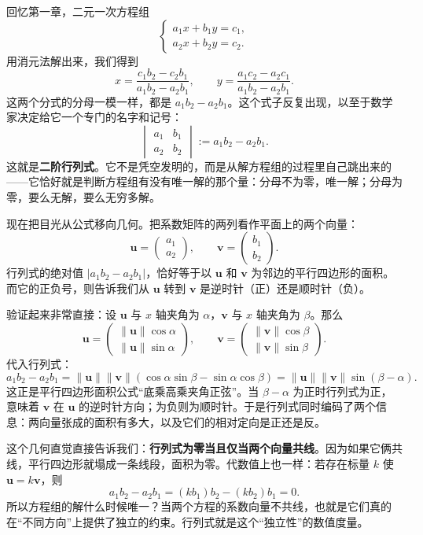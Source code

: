 \documentclass[UTF8]{ctexbook}
\begin{document}
回忆第一章，二元一次方程组
\begin{equation*}
\begin{cases}
 a_1x+b_1y=c_1,\\
 a_2x+b_2y=c_2.
\end{cases}
\end{equation*}
用消元法解出来，我们得到
\[
x=\frac{c_1b_2-c_2b_1}{a_1b_2-a_2b_1},\qquad
y=\frac{a_1c_2-a_2c_1}{a_1b_2-a_2b_1}.
\]
这两个分式的分母一模一样，都是 $a_1b_2-a_2b_1$。这个式子反复出现，以至于数学家决定给它一个专门的名字和记号：
\[
\begin{vmatrix}
a_1 & b_1\\
a_2 & b_2
\end{vmatrix}
:= a_1b_2-a_2b_1.
\]
这就是\textbf{二阶行列式}。它不是凭空发明的，而是从解方程组的过程里自己跳出来的——它恰好就是判断方程组有没有唯一解的那个量：分母不为零，唯一解；分母为零，要么无解，要么无穷多解。

现在把目光从公式移向几何。把系数矩阵的两列看作平面上的两个向量：
\[
\mathbf{u}=\begin{pmatrix}a_1\\a_2\end{pmatrix},\qquad
\mathbf{v}=\begin{pmatrix}b_1\\b_2\end{pmatrix}.
\]
行列式的绝对值 $|a_1b_2-a_2b_1|$，恰好等于以 $\mathbf{u}$ 和 $\mathbf{v}$ 为邻边的平行四边形的面积。而它的正负号，则告诉我们从 $\mathbf{u}$ 转到 $\mathbf{v}$ 是逆时针（正）还是顺时针（负）。

验证起来非常直接：设 $\mathbf{u}$ 与 $x$ 轴夹角为 $\alpha$，$\mathbf{v}$ 与 $x$ 轴夹角为 $\beta$。那么
\[
\mathbf{u}=\begin{pmatrix}\|\mathbf{u}\|\cos\alpha\\ \|\mathbf{u}\|\sin\alpha\end{pmatrix},\qquad
\mathbf{v}=\begin{pmatrix}\|\mathbf{v}\|\cos\beta\\ \|\mathbf{v}\|\sin\beta\end{pmatrix}.
\]
代入行列式：
\[
a_1b_2-a_2b_1
=\|\mathbf{u}\|\|\mathbf{v}\|(\cos\alpha\sin\beta-\sin\alpha\cos\beta)
=\|\mathbf{u}\|\|\mathbf{v}\|\sin(\beta-\alpha).
\]
这正是平行四边形面积公式“底乘高乘夹角正弦”。当 $\beta-\alpha$ 为正时行列式为正，意味着 $\mathbf{v}$ 在 $\mathbf{u}$ 的逆时针方向；为负则为顺时针。于是行列式同时编码了两个信息：两向量张成的面积有多大，以及它们的相对定向是正还是反。

这个几何直觉直接告诉我们：\textbf{行列式为零当且仅当两个向量共线}。因为如果它俩共线，平行四边形就塌成一条线段，面积为零。代数值上也一样：若存在标量 $k$ 使 $\mathbf{u}=k\mathbf{v}$，则
\[
a_1b_2-a_2b_1 = (k b_1)b_2 - (k b_2)b_1 = 0.
\]
所以方程组的解什么时候唯一？当两个方程的系数向量不共线，也就是它们真的在“不同方向”上提供了独立的约束。行列式就是这个“独立性”的数值度量。
\end{document}
